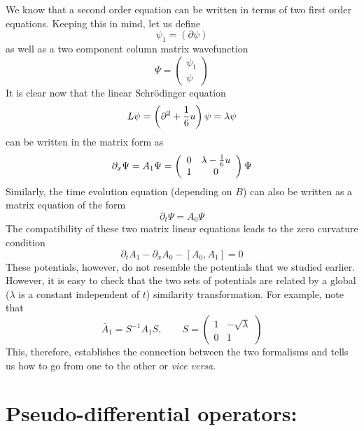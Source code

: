 \documentclass[a4paper,11pt]{article}
\begin{document}
We know that a second order equation can be written in terms of two
first order equations. Keeping this in mind, let us define
\begin{equation}
\psi_{1} = (\partial \psi)
\end{equation} 
as well as a two component column matrix wavefunction
\begin{equation}
\Psi = \left(\begin{array}{c}
\psi_{1}\\
\psi
\end{array}\right)
\end{equation}
It is clear now that the linear Schr\"{o}dinger equation
$$
L \psi = \left(\partial^{2} + {1\over 6} u\right) \psi = \lambda \psi
$$
can be written in the matrix form as
\begin{equation}
\partial_{x} \Psi = A_{1} \Psi = \left(\begin{array}{cc}
0 & \lambda - {1\over 6} u\\
1 & 0
\end{array}\right) \Psi
\end{equation}
Similarly, the time evolution equation (depending on $B$) can also be
written as a matrix equation of the form
\begin{equation}
\partial_{t} \Psi = A_{0} \Psi
\end{equation}
The compatibility of these two matrix linear equations leads to the
zero curvature condition
\begin{equation}
\partial_{t} A_{1} - \partial_{x} A_{0} - \left[ A_{0} , A_{1}\right]
= 0
\end{equation}
These potentials, however, do not resemble the potentials that we
studied earlier. However, it is easy to check that the two sets of
potentials are related by a global ($\lambda$ is a constant
independent of $t$) similarity transformation. For example, note that
\begin{equation}
\bar{A}_{1} = S^{-1} A_{1} S,\qquad S = \left(\begin{array}{cc}
1 & - \sqrt{\lambda}\\
0 & 1
\end{array}\right)
\end{equation}
This, therefore, establishes the connection between the two formalisms
and tells us how to go from one to the other or {\em vice versa}.

\section{Pseudo-differential operators:}
\end{document}
